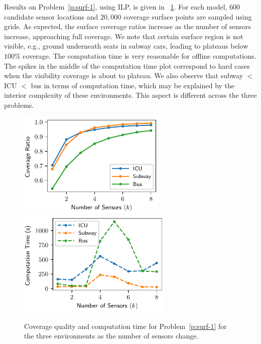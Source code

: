 Results on Problem~\ref{p:surf-1}, using ILP, is given in ~\ref{fig:surf-coverage-ratio-vis}. 
For each model, $600$ candidate sensor locations and $20,000$ coverage surface points are sampled using grids. 
As expected, the surface coverage ratios increase as the number of sensors increase, approaching full coverage. We note that certain surface region is not visible, e.g., ground underneath seats in subway cars, leading to plateaus below $100\%$ coverage. The computation time is very reasonable for offline computations. The spikes in the middle of the computation time plot correspond to hard cases when the visibility coverage is about to plateau. We also observe that subway $<$ ICU $<$ bus in terms 
of computation time, which may be explained by the interior complexity of these environments. This aspect is different across the three problems.

\begin{figure}[!ht]
\vspace{1mm}
    \centering
    \includegraphics[width=0.475\columnwidth, height=2in]{chapters/surf/fig/result-coverage-ratio-eps-converted-to.pdf}
    \includegraphics[width=0.49\columnwidth, height=2in]{chapters/surf/fig/result-time-eps-converted-to.pdf}
    \caption[Coverage quality and computation time for Problem~\ref{p:surf-1}]
    {Coverage quality and computation time for Problem~\ref{p:surf-1} for the three environments as the number of sensors change.}
    \label{fig:surf-coverage-ratio-vis}

\end{figure}

